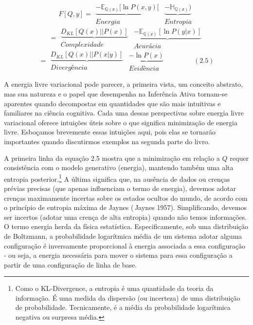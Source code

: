 \documentclass[
  12pt,
]{book}
\begin{document}
\[F[Q,y]=
\begin{matrix}  \underbrace{  -\mathbb{E_{Q(x)}}[\ln P(x,y) }[\\ Energia \end{matrix}
\begin{matrix}  \underbrace{  -\mathbb{H_{Q(x)}}) } \\ Entropia \end{matrix}\]
\[=
\begin{matrix}  \underbrace{  D_{KL}{[Q(x)||P(x)]}}\\ Complexidade \end{matrix}
\begin{matrix}  \underbrace{  -\mathbb{E_{Q(x)}}[\ln P(y|x)]}\\ Acurácia \end{matrix}\]
\[=\begin{matrix} \underbrace{ D_{KL}{[Q(x) || P(x|y)]} } \\ Divergência \end{matrix}
\begin{matrix} \underbrace{-\ln P(x)} \\ Evidência \end{matrix} \qquad\qquad (2.5)
\]

A energia livre variacional pode parecer, a primeira vista, um conceito abstrato, mas sua natureza e o papel que desempenha na Inferência Ativa tornam-se aparentes quando decompostas em quantidades que são mais intuitivas e familiares na ciência cognitiva. Cada uma dessas perspectivas sobre energia livre variacional oferece intuições úteis sobre o que significa minimização de energia livre. Esboçamos brevemente essas intuições aqui, pois elas se tornarão importantes quando discutirmos exemplos na segunda parte do livro.

A primeira linha da equação 2.5 mostra que a minimização em relação a \(Q\) requer consistência com o modelo generativo (energia), mantendo também uma alta entropia posterior.\footnote{Como o KL-Divergence, a entropia é uma quantidade da teoria da informação. É uma medida da dispersão (ou incerteza) de uma distribuição de probabilidade. Tecnicamente, é a média da probabilidade logarítmica negativa ou surpresa média.} A última significa que, na ausência de dados ou crenças prévias precisas (que apenas influenciam o termo de energia), devemos adotar crenças maximamente incertas sobre os estados ocultos do mundo, de acordo com o princípio de entropia máxima de Jaynes ( Jaynes 1957). Simplificando, devemos ser incertos (adotar uma crença de alta entropia ) quando não temos informações. O termo energia herda da física estatística. Especificamente, sob uma distribuição de Boltzmann, a probabilidade logarítmica média de um sistema adotar alguma configuração é inversamente proporcional à energia associada a essa configuração - ou seja, a energia necessária para mover o sistema para essa configuração a partir de uma configuração de linha de base.
\end{document}
